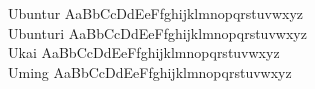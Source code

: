 \begin{tabbing}
Ubuntur \> { AaBbCcDdEeFfghijklmnopqrstuvwxyz} \\
Ubunturi \> { AaBbCcDdEeFfghijklmnopqrstuvwxyz} \\
Ukai \> { AaBbCcDdEeFfghijklmnopqrstuvwxyz} \\
Uming \> { AaBbCcDdEeFfghijklmnopqrstuvwxyz} \\
\end{tabbing}


